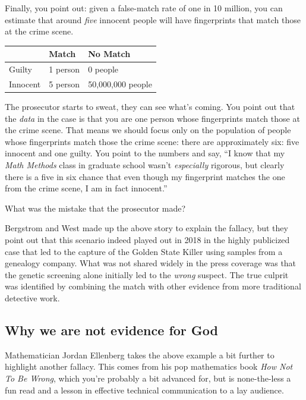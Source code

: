 Finally, you point out: given a false-match rate of one in 10 million, you can estimate that around \emph{five} innocent people will have fingerprints that match those at the crime scene. 
\begin{center}
\begin{tabular}{l|ll} \toprule %
		& Match & No Match
		\\ \hline
		Guilty & {1 person} & {0 people}
		\\
		Innocent & {5 person} & {50,000,000 people}
		\\ \bottomrule
\end{tabular}
\end{center}
The prosecutor starts to sweat, they can see what's coming. You point out that the \emph{data} in the case is that you are one person whose fingerprints match those at the crime scene. That means we should focus only on the population of people whose fingerprints match those the crime scene: there are approximately six: five innocent and one guilty. You point to the numbers and say, ``I know that my \emph{Math Methods} class in graduate school wasn't \emph{especially} rigorous, but clearly there is a five in six chance that even though my fingerprint matches the one from the crime scene, I am in fact innocent.''
\begin{exercise}
What was the mistake that the prosecutor made?
\end{exercise}
Bergstrom and West made up the above story to explain the fallacy, but they point out that this scenario indeed played out in 2018 in the highly publicized case that led to the capture of the Golden State Killer using  samples from a genealogy company. What was not shared widely in the press coverage was that the genetic screening alone initially led to the \emph{wrong} suspect. The true culprit was identified by combining the  match with other evidence from more traditional detective work.

\subsection{Why we are not evidence for God}

Mathematician Jordan Ellenberg takes the above example a bit further to highlight another fallacy. This comes from his pop mathematics book \emph{How Not To Be Wrong}, which you're probably a bit advanced for, but is none-the-less a fun read and a lesson in effective technical communication to a lay audience. 

